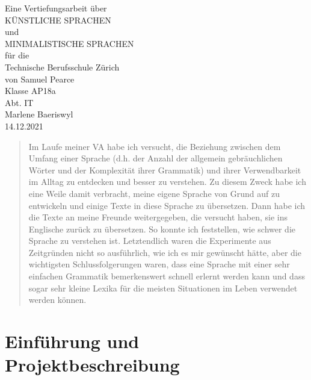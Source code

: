 \documentclass{article}
\begin{document}
\graphicspath{ {../images/} }

\begingroup
\centering
\vfill
\Large{Eine Vertiefungsarbeit über}\\
\Huge{KÜNSTLICHE SPRACHEN}\\
\huge{und}\\
\huge{MINIMALISTISCHE SPRACHEN}\\
\large{für die}\\
\Large{Technische Berufsschule Zürich}\\
\vspace{2cm}
\Large{von Samuel Pearce}\\
\vspace{1cm}
\large{Klasse AP18a}\\
\large{Abt. IT}\\
\large{Marlene Baeriswyl}\\
\vspace{1cm}
\Large{14.12.2021}\\
\vfill\null
\endgroup
\thispagestyle{empty}

\renewcommand{\abstractname}{Abstrakt}

\begin{abstract}
    Im Laufe meiner VA habe ich versucht, die Beziehung zwischen dem Umfang einer Sprache
    (d.h. der Anzahl der allgemein gebräuchlichen Wörter und der Komplexität ihrer Grammatik)
    und ihrer Verwendbarkeit im Alltag zu entdecken und besser zu verstehen.
    Zu diesem Zweck habe ich eine Weile damit verbracht, meine eigene Sprache von Grund auf zu
    entwickeln und einige Texte in diese Sprache zu übersetzen. Dann habe ich die Texte an meine
    Freunde weitergegeben, die versucht haben, sie ins Englische zurück zu übersetzen.
    So konnte ich feststellen, wie schwer die Sprache zu verstehen ist.
    Letztendlich waren die Experimente aus Zeitgründen nicht so ausführlich,
    wie ich es mir gewünscht hätte, aber die wichtigsten Schlussfolgerungen waren,
    dass eine Sprache mit einer sehr einfachen Grammatik bemerkenswert schnell erlernt
    werden kann und dass sogar sehr kleine Lexika für die meisten Situationen im Leben verwendet werden können.
\end{abstract}
\pagebreak

\tableofcontents
\pagebreak



\section{Einführung und Projektbeschreibung}
\end{document}
